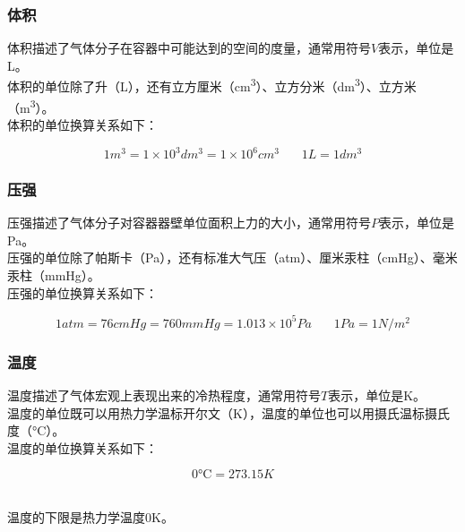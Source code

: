 \documentclass[UTF8]{ctexart}
\begin{document}
\subsubsection{体积}
    体积描述了气体分子在容器中可能达到的空间的度量，通常用符号$V$表示，单位是\si{L}。\\[3mm]
    体积的单位除了升（\si{L}），还有立方厘米（\si{cm^3}）、立方分米（\si{dm^3}）、立方米（\si{m^3}）。\\[3mm]
    体积的单位换算关系如下：
    \begin{large}
        \begin{equation*}
            1\si{m^3}=1\times10^3\si{dm^3}=1\times10^6\si{cm^3}~~~~~~~~1\si{L}=1\si{dm^3}
        \end{equation*}
    \end{large}\vspace{-20pt}

\subsubsection{压强}
    压强描述了气体分子对容器器壁单位面积上力的大小，通常用符号$P$表示，单位是\si{Pa}。\\[3mm]
    压强的单位除了帕斯卡（\si{Pa}），还有标准大气压（\si{atm}）、厘米汞柱（\si{cmHg}）、毫米汞柱（\si{mmHg}）。\\[3mm]
    压强的单位换算关系如下：
    \begin{large}
        \begin{equation*}
            1\si{atm}=76\si{cmHg}=760\si{mmHg}=1.013\times 10^5\si{Pa}~~~~~~~~1\si{Pa}=1\si{N/m^2}
        \end{equation*}
    \end{large}\vspace{-20pt}

\subsubsection{温度}
    温度描述了气体宏观上表现出来的冷热程度，通常用符号$T$表示，单位是\si{K}。\\[3mm]
    温度的单位既可以用热力学温标开尔文（\si{K}），温度的单位也可以用摄氏温标摄氏度（\si{\degreeCelsius}）。\\[3mm]
    温度的单位换算关系如下：
    \begin{large}
        \begin{equation*}
            0\si{\degreeCelsius}=273.15\si{K}
        \end{equation*}
    \end{large}\\
    温度的下限是热力学温度$0$\si{K}。
\end{document}
